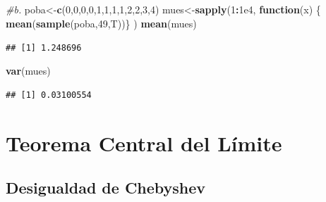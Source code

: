 \documentclass[
  ignorenonframetext,
]{beamer}
\newenvironment{Shaded}{\begin{snugshade}}{\end{snugshade}}
\newcommand{\CommentTok}[1]{\textcolor[rgb]{0.56,0.35,0.01}{\textit{#1}}}
\newcommand{\ControlFlowTok}[1]{\textcolor[rgb]{0.13,0.29,0.53}{\textbf{#1}}}
\newcommand{\DecValTok}[1]{\textcolor[rgb]{0.00,0.00,0.81}{#1}}
\newcommand{\FloatTok}[1]{\textcolor[rgb]{0.00,0.00,0.81}{#1}}
\newcommand{\KeywordTok}[1]{\textcolor[rgb]{0.13,0.29,0.53}{\textbf{#1}}}
\newcommand{\NormalTok}[1]{#1}
\newcommand{\OperatorTok}[1]{\textcolor[rgb]{0.81,0.36,0.00}{\textbf{#1}}}
\begin{document}
\hypertarget{section-10}{%
\subsection{}\label{section-10}}

\begin{frame}[fragile]{}

\begin{Shaded}
\begin{Highlighting}[]
\CommentTok{#b.}
\NormalTok{poba<-}\KeywordTok{c}\NormalTok{(}\DecValTok{0}\NormalTok{,}\DecValTok{0}\NormalTok{,}\DecValTok{0}\NormalTok{,}\DecValTok{0}\NormalTok{,}\DecValTok{1}\NormalTok{,}\DecValTok{1}\NormalTok{,}\DecValTok{1}\NormalTok{,}\DecValTok{1}\NormalTok{,}\DecValTok{2}\NormalTok{,}\DecValTok{2}\NormalTok{,}\DecValTok{3}\NormalTok{,}\DecValTok{4}\NormalTok{)}
\NormalTok{mues<-}\KeywordTok{sapply}\NormalTok{(}\DecValTok{1}\OperatorTok{:}\FloatTok{1e4}\NormalTok{, }\ControlFlowTok{function}\NormalTok{(x) \{}
\KeywordTok{mean}\NormalTok{(}\KeywordTok{sample}\NormalTok{(poba,}\DecValTok{49}\NormalTok{,T))\} )}
\KeywordTok{mean}\NormalTok{(mues)}
\end{Highlighting}
\end{Shaded}

\begin{verbatim}
## [1] 1.248696
\end{verbatim}

\begin{Shaded}
\begin{Highlighting}[]
\KeywordTok{var}\NormalTok{(mues)}
\end{Highlighting}
\end{Shaded}

\begin{verbatim}
## [1] 0.03100554
\end{verbatim}

\end{frame}

\hypertarget{teorema-central-del-luxedmite}{%
\section{Teorema Central del
Límite}\label{teorema-central-del-luxedmite}}

\hypertarget{desigualdad-de-chebyshev}{%
\subsection{Desigualdad de Chebyshev}\label{desigualdad-de-chebyshev}}
\end{document}
